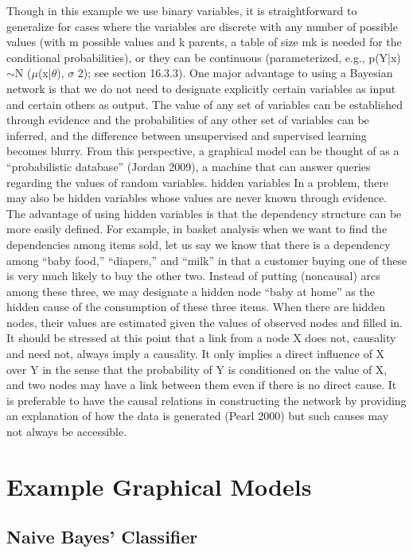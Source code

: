 Though in this example we use binary variables, it is straightforward to generalize for cases where the variables are discrete with any number of possible values (with m possible values and k parents, a table of size mk is needed for the conditional probabilities), or they can be continuous (parameterized, e.g., p(Y|x) $\sim$N ($\mu$(x|$\theta$), $\sigma$ 2); see section 16.3.3). One major advantage to using a Bayesian network is that we do not need to designate explicitly certain variables as input and certain others as output. The value of any set of variables can be established through evidence and the probabilities of any other set of variables can be inferred, and the difference between unsupervised and supervised learning becomes blurry. From this perspective, a graphical model can be thought of as a “probabilistic database” (Jordan 2009), a machine that can answer queries regarding the values of random variables. hidden variables In a problem, there may also be hidden variables whose values are never known through evidence. The advantage of using hidden variables is that the dependency structure can be more easily defined. For example, in basket analysis when we want to find the dependencies among items sold, let us say we know that there is a dependency among “baby food,” “diapers,” and “milk” in that a customer buying one of these is very much likely to buy the other two. Instead of putting (noncausal) arcs among these three, we may designate a hidden node “baby at home” as the hidden cause of the consumption of these three items. When there are hidden nodes, their values are estimated given the values of observed nodes and filled in. It should be stressed at this point that a link from a node X does not, causality and need not, always imply a causality. It only implies a direct influence of X over Y in the sense that the probability of Y is conditioned on the value of X, and two nodes may have a link between them even if there is no direct cause. It is preferable to have the causal relations in constructing the network by providing an explanation of how the data is generated (Pearl 2000) but such causes may not always be accessible.

\section{Example Graphical Models}

\subsection{Naive Bayes’ Classifier}

